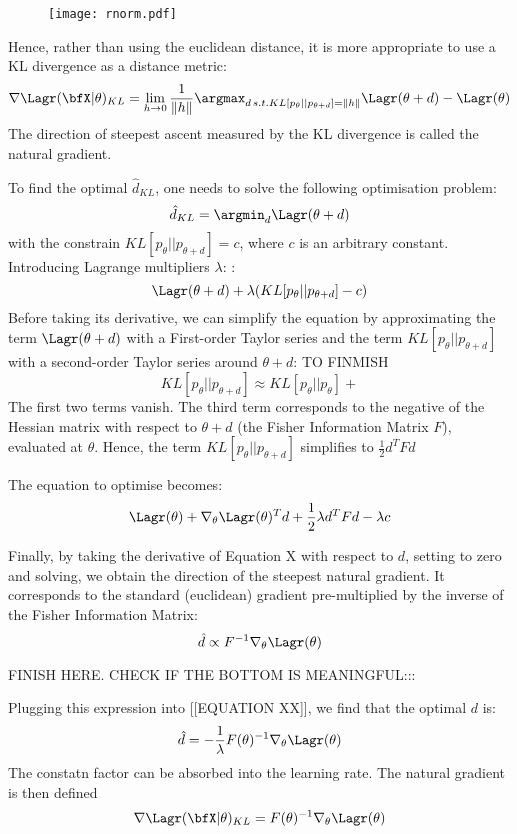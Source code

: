 \begin{figure}[]
	\begin{center}
		\texttt{[image: rnorm.pdf]}
		\caption{}
		\label{fig:XX}
	\end{center}
\end{figure}

Hence, rather than using the euclidean distance, it is more appropriate to use a KL divergence as a distance metric:
\[
	\nabla \Lagr(\bfX|\theta)_{KL} = \lim_{h\to0} \frac{1}{\|h\|}\argmax_{d \, s.t. KL[p_\theta||p_{\theta+d}]=\|h\|} \Lagr(\theta+d) - \Lagr(\theta)
\]
The direction of steepest ascent measured by the KL divergence is called the natural gradient.

To find the optimal $\hat{d}_{KL}$, one needs to solve the following optimisation problem:
\[
	\hat{d}_{KL} = \argmin_{d} \Lagr(\theta+d)
\]
with the constrain $KL[p_\theta||p_{\theta+d}]=c$, where $c$ is an arbitrary constant. Introducing Lagrange multipliers $\lambda$: \cite{??}:
\[
	\Lagr(\theta+d) + \lambda(KL[p_\theta||p_{\theta+d}] - c)
\]
Before taking its derivative, we can simplify the equation by approximating the  term $ \Lagr(\theta+d)$ with a First-order Taylor series and the term $KL[p_\theta||p_{\theta+d}]$ with a second-order Taylor series around $\theta+d$:
TO FINMISH
\[
KL[p_\theta||p_{\theta+d}]  \approx 
KL[p_\theta||p_{\theta}] + 
\]
The first two terms vanish. The third term corresponds to the negative of the Hessian matrix with respect to $\theta+d$ (the Fisher Information Matrix $F$), evaluated at $\theta$. Hence, the term $KL[p_\theta||p_{\theta+d}]$ simplifies to $\frac{1}{2} d^T F d$

The equation to optimise becomes:
\[
\Lagr(\theta) + \nabla_{\theta} \Lagr(\theta)^T d + \frac{1}{2} \lambda d^T F d - \lambda c
\]

Finally, by taking the derivative of Equation X with respect to $d$, setting to zero and solving, we obtain the direction of the steepest natural gradient. It corresponds to the standard (euclidean) gradient pre-multiplied by the inverse of the Fisher Information Matrix:
\[
\hat{d} \propto F^{-1} \nabla_{\theta} \Lagr(\theta)
\]


FINISH HERE. CHECK IF THE BOTTOM IS MEANINGFUL:::

Plugging this expression into [[EQUATION XX]], we find that the optimal $d$ is:
\[
\hat{d} = -\frac{1}{\lambda} F(\theta)^{-1} \nabla_{\theta} \Lagr(\theta)
\]
The constatn factor can be absorbed into the learning rate. The natural gradient is then defined
\[
\nabla \Lagr(\bfX|\theta)_{KL} = F(\theta)^{-1} \nabla_{\theta} \Lagr(\theta)
\]


